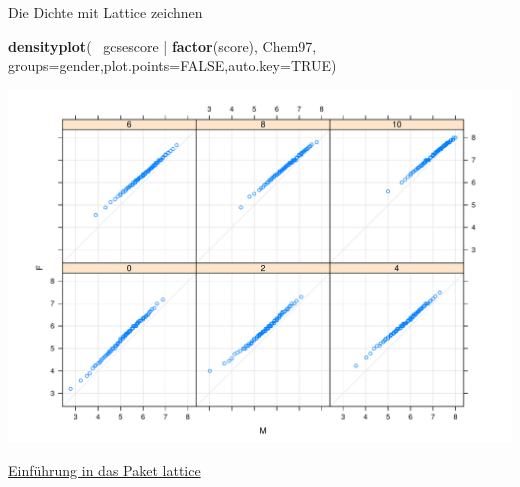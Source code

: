 \documentclass[ignorenonframetext,]{beamer}
\newenvironment{Shaded}{}{}
\newcommand{\KeywordTok}[1]{\textcolor[rgb]{0.00,0.44,0.13}{\textbf{{#1}}}}
\newcommand{\DataTypeTok}[1]{\textcolor[rgb]{0.56,0.13,0.00}{{#1}}}
\newcommand{\StringTok}[1]{\textcolor[rgb]{0.25,0.44,0.63}{{#1}}}
\newcommand{\OtherTok}[1]{\textcolor[rgb]{0.00,0.44,0.13}{{#1}}}
\newcommand{\NormalTok}[1]{{#1}}
\begin{document}
\begin{frame}[fragile]{Die Dichte mit Lattice zeichnen}

\begin{Shaded}
\begin{Highlighting}[]
\KeywordTok{densityplot}\NormalTok{(~}\StringTok{ }\NormalTok{gcsescore |}\StringTok{ }\KeywordTok{factor}\NormalTok{(score), Chem97, }
    \DataTypeTok{groups=}\NormalTok{gender,}\DataTypeTok{plot.points=}\OtherTok{FALSE}\NormalTok{,}\DataTypeTok{auto.key=}\OtherTok{TRUE}\NormalTok{)}
\end{Highlighting}
\end{Shaded}

\includegraphics{R_intern_files/figure-beamer/unnamed-chunk-227-1.pdf}

\href{http://www.isid.ac.in/~deepayan/R-tutorials/labs/04_lattice_lab.pdf}{Einführung
in das Paket lattice}

\end{frame}
\end{document}
